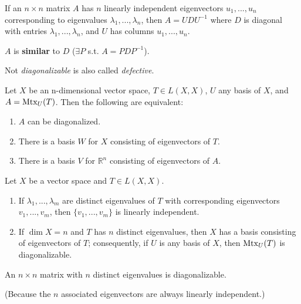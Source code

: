 \documentclass[11pt]{elegantbook}
\begin{document}
\begin{theorem}
    If an $n\times n$ matrix $A$ has $n$ linearly independent eigenvectors $u_1,...,u_n$ corresponding to eigenvalues $\lambda_1,...,\lambda_n$, then $A = UDU^{-1}$ where $D$ is diagonal with entries $\lambda_1,...,\lambda_n$, and $U$ has columns $u_1,...,u_n$.
\end{theorem}
$A$ is \textbf{similar} to $D$ ($\exists P$ s.t. $A=PDP^{-1}$).

Not \textit{diagonalizable} is also called \textit{defective}.


\begin{theorem}
    Let $X$ be an n-dimensional vector space, $T \in L(X, X)$, $U$ any basis of $X$, and $A = \textnormal{Mtx}_U(T)$. Then the following are equivalent:
    \begin{enumerate}
        \item $A$ can be diagonalized.
        \item There is a basis $W$ for $X$ consisting of eigenvectors of $T$.
        \item There is a basis $V$ for $\mathbb{R}^n$ consisting of eigenvectors of $A$.
    \end{enumerate}
\end{theorem}

\begin{theorem}
    Let $X$ be a vector space and $T \in L(X, X)$.
    \begin{enumerate}
        \item If $\lambda_1, . . . , \lambda_m$ are distinct eigenvalues of $T$ with corresponding eigenvectors $v_1, . . . , v_m$, then $\{v_1, . . . , v_m\}$ is linearly independent.
        \item If $\dim X = n$ and $T$ has $n$ distinct eigenvalues, then $X$ has a basis consisting of eigenvectors of $T$; consequently, if $U$ is any basis of $X$, then $\textnormal{Mtx}_U(T)$ is diagonalizable.
    \end{enumerate}
\end{theorem}

\begin{corollary}
    An $n\times n$ matrix with $n$ distinct eigenvalues is diagonalizable.
\end{corollary}
(Because the $n$ associated eigenvectors are always linearly independent.)
\end{document}
